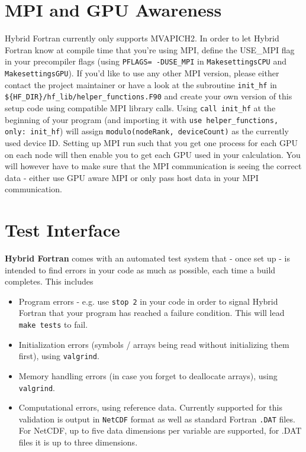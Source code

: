 \section{MPI and GPU Awareness}
Hybrid Fortran currently only supports MVAPICH2. In order to let Hybrid Fortran know at compile time that you're using MPI, define the USE_MPI flag in your precompiler flags (using \verb|PFLAGS= -DUSE_MPI| in \verb|MakesettingsCPU| and \verb|MakesettingsGPU|). If you'd like to use any other MPI version, please either contact the project maintainer or have a look at the subroutine \verb|init_hf| in \verb|${HF_DIR}/hf_lib/helper_functions.F90| and create your own version of this setup code using compatible MPI library calls. \newline
\newline
Using \verb|call init_hf| at the beginning of your program (and importing it with \verb|use helper_functions, only: init_hf|) will assign \verb|modulo(nodeRank, deviceCount)| as the currently used device ID. Setting up MPI run such that you get one process for each GPU on each node will then enable you to get each GPU used in your calculation. \newline
\newline
You will however have to make sure that the MPI communication is seeing the correct data - either use GPU aware MPI or only pass host data in your MPI communication.

\section{Test Interface} \label{sec:testSystem}
\textbf{Hybrid Fortran} comes with an automated test system that - once set up - is intended to find errors in your code as much as possible, each time a build completes. This includes
\begin{itemize}
 \item Program errors - e.g. use \verb|stop 2| in your code in order to signal Hybrid Fortran that your program has reached a failure condition. This will lead \verb|make tests| to fail.
 \item Initialization errors (symbols / arrays being read without initializing them first), using \verb|valgrind|.
 \item Memory handling errors (in case you forget to deallocate arrays), using \verb|valgrind|.
 \item Computational errors, using reference data. Currently supported for this validation is output in \verb|NetCDF| format as well as standard Fortran \verb|.DAT| files. For NetCDF, up to five data dimensions per variable are supported, for .DAT files it is up to three dimensions.
\end{itemize}

